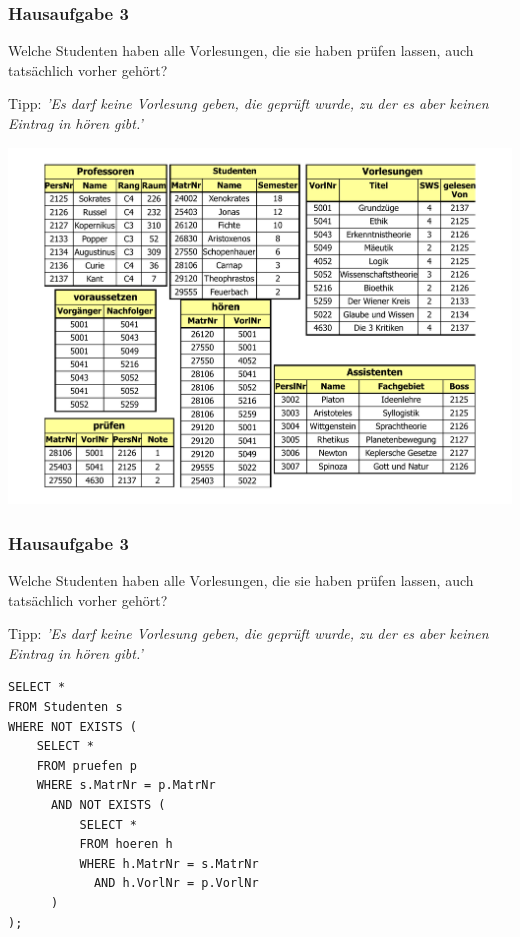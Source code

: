 \begin{frame}[fragile]
\frametitle{Hausaufgabe 3}
\vspace{0.25cm}

\begin{multicols}{2}
	Welche Studenten haben alle Vorlesungen, 
	die sie haben prüfen lassen, auch tatsächlich vorher gehört?

	Tipp: \textit{'Es darf keine Vorlesung geben, die geprüft wurde, 
	zu der es aber keinen Eintrag in hören gibt.'}
	\vfill\columnbreak

	\begin{center}
		\includegraphics[height=.6\paperheight]{../img/uni.pdf}
	\end{center}
\end{multicols}
\end{frame}

\begin{frame}[fragile]
\frametitle{Hausaufgabe 3}
\vspace{0.25cm}

\begin{multicols}{2}
	Welche Studenten haben alle Vorlesungen, 
	die sie haben prüfen lassen, auch tatsächlich vorher gehört?

	Tipp: \textit{'Es darf keine Vorlesung geben, die geprüft wurde, 
	zu der es aber keinen Eintrag in hören gibt.'}
	\vfill\columnbreak

	\begin{verbatim}
SELECT *
FROM Studenten s
WHERE NOT EXISTS (
	SELECT *
	FROM pruefen p
	WHERE s.MatrNr = p.MatrNr
	  AND NOT EXISTS (
		  SELECT *
		  FROM hoeren h
		  WHERE h.MatrNr = s.MatrNr
		    AND h.VorlNr = p.VorlNr
	  )
);
	\end{verbatim}
\end{multicols}
\end{frame}

